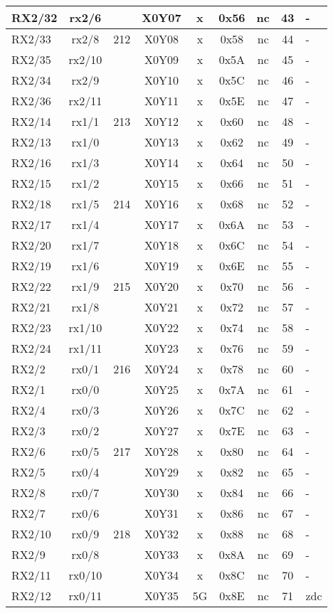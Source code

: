 \begin{longtable}{|l|c|c|c|c|c|c|c|l|}
RX2/32 & rx2/6  &     & X0Y07 &  x  & 0x56 & nc & 43 & -\\\hline   
RX2/33 & rx2/8  & 212 & X0Y08 &  x  & 0x58 & nc & 44 & -\\\hline   
RX2/35 & rx2/10 &     & X0Y09 &  x  & 0x5A & nc & 45 & -\\\hline   
RX2/34 & rx2/9  &     & X0Y10 &  x  & 0x5C & nc & 46 & -\\\hline   
RX2/36 & rx2/11 &     & X0Y11 &  x  & 0x5E & nc & 47 & -\\\hline   
RX2/14 & rx1/1  & 213 & X0Y12 &  x  & 0x60 & nc & 48 & -\\\hline   
RX2/13 & rx1/0  &     & X0Y13 &  x  & 0x62 & nc & 49 & -\\\hline   
RX2/16 & rx1/3  &     & X0Y14 &  x  & 0x64 & nc & 50 & -\\\hline   
RX2/15 & rx1/2  &     & X0Y15 &  x  & 0x66 & nc & 51 & -\\\hline   
RX2/18 & rx1/5  & 214 & X0Y16 &  x  & 0x68 & nc & 52 & -\\\hline   
RX2/17 & rx1/4  &     & X0Y17 &  x  & 0x6A & nc & 53 & -\\\hline   
RX2/20 & rx1/7  &     & X0Y18 &  x  & 0x6C & nc & 54 & -\\\hline   
RX2/19 & rx1/6  &     & X0Y19 &  x  & 0x6E & nc & 55 & -\\\hline   
RX2/22 & rx1/9  & 215 & X0Y20 &  x  & 0x70 & nc & 56 & -\\\hline   
RX2/21 & rx1/8  &     & X0Y21 &  x  & 0x72 & nc & 57 & -\\\hline   
RX2/23 & rx1/10 &     & X0Y22 &  x  & 0x74 & nc & 58 & -\\\hline   
RX2/24 & rx1/11 &     & X0Y23 &  x  & 0x76 & nc & 59 & -\\\hline   
RX2/2  & rx0/1  & 216 & X0Y24 &  x  & 0x78 & nc & 60 & -\\\hline   
RX2/1  & rx0/0  &     & X0Y25 &  x  & 0x7A & nc & 61 & -\\\hline   
RX2/4  & rx0/3  &     & X0Y26 &  x  & 0x7C & nc & 62 & -\\\hline   
RX2/3  & rx0/2  &     & X0Y27 &  x  & 0x7E & nc & 63 & -\\\hline   
RX2/6  & rx0/5  & 217 & X0Y28 &  x  & 0x80 & nc & 64 & -\\\hline   
RX2/5  & rx0/4  &     & X0Y29 &  x  & 0x82 & nc & 65 & -\\\hline   
RX2/8  & rx0/7  &     & X0Y30 &  x  & 0x84 & nc & 66 & -\\\hline   
RX2/7  & rx0/6  &     & X0Y31 &  x  & 0x86 & nc & 67 & -\\\hline   
RX2/10 & rx0/9  & 218 & X0Y32 &  x  & 0x88 & nc & 68 & -\\\hline   
RX2/9  & rx0/8  &     & X0Y33 &  x  & 0x8A & nc & 69 & -\\\hline   
RX2/11 & rx0/10 &     & X0Y34 &  x  & 0x8C & nc & 70 & -\\\hline   
RX2/12 & rx0/11 &     & X0Y35 &  5G  & 0x8E & nc & 71 & zdc\\\hline   
\end{longtable}                  

